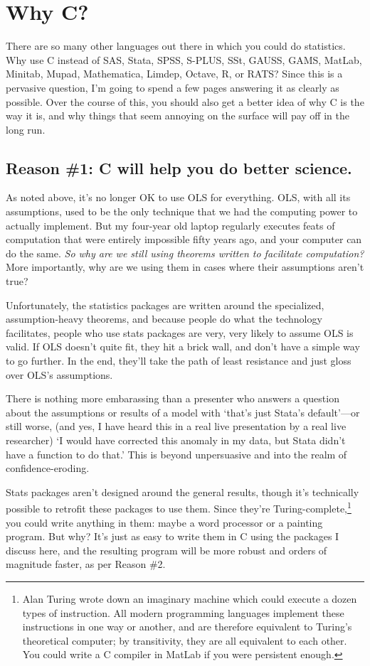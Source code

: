 \section{Why C?}

There are so many other languages out there in which you could do
statistics. Why use C instead of SAS, Stata, SPSS, S-PLUS, SSt, GAUSS, GAMS,
MatLab, Minitab, Mupad, Mathematica, Limdep, Octave, R, or RATS? Since this is a
pervasive question, I'm going to spend a few pages answering it as clearly
as possible. Over the course of this, you should also get a better idea
of why C is the way it is, and why things that seem annoying on
the surface will pay off in the long run.

	\ifbook
\subsection{Reason \#1: C will help you do better science.}
As noted above, it's no longer OK to use OLS for everything.
OLS, with all its assumptions, used to be the only technique that we had the computing
power to actually implement. But my four-year old laptop regularly executes
feats of computation that were entirely impossible fifty years ago, and your
computer can do the same.  {\it So why are
we still using theorems written to facilitate computation?} More importantly, why
are we using them in cases where their assumptions aren't true?

Unfortunately, the statistics packages are written around the
specialized, assumption-heavy theorems, and because people do what the
technology facilitates, people who use stats packages are very, very
likely to assume OLS is valid.  If OLS doesn't quite fit, they hit a
brick wall, and don't have a simple way to go further. In the end, they'll
take the path of least resistance and just gloss over OLS's assumptions.

There is nothing more embarassing than a presenter who answers a question
about the assumptions or results of a model with `that's just Stata's
default'---or still worse, (and yes, I have heard this in a real live
presentation by a real live researcher) `I would have corrected this
anomaly in my data, but Stata didn't have a function to do that.' This
is beyond unpersuasive and into the realm of confidence-eroding.

Stats packages aren't designed around the general results, though
it's technically possible to retrofit these packages to use them. Since
they're Turing-complete,\footnote{Alan Turing wrote down an imaginary
machine which could execute a dozen types of instruction.  All
modern programming languages implement these instructions in one way or
another, and are therefore equivalent to Turing's theoretical computer;
by transitivity, they are all equivalent to each other. You could
write a C compiler in MatLab if you were persistent enough.} you could
write anything in them: maybe a word processor or a painting program. But
why? It's just as easy to write them in C using the packages I discuss
here, and the resulting program will be more robust and orders of
magnitude faster, as per Reason \#2.
	\fi

